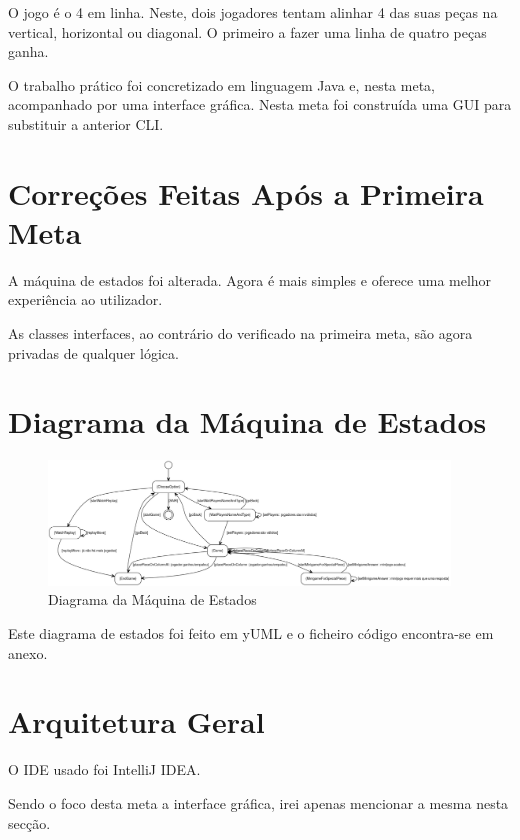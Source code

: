 \documentclass[11pt]{article}
\begin{document}
	O jogo é o 4 em linha. Neste, dois jogadores tentam alinhar 4 das suas peças na vertical, horizontal ou diagonal. O primeiro a fazer uma linha de quatro peças ganha.
	
	O trabalho prático foi concretizado em linguagem Java e, nesta meta, acompanhado por uma interface gráfica. Nesta meta foi construída uma GUI para substituir a anterior CLI.
   	
   	
   	\large
   	\section{Correções Feitas Após a Primeira Meta}
   	\normalsize
   	
   	A máquina de estados foi alterada. Agora é mais simples e oferece uma melhor experiência ao utilizador.
   	
   	As classes interfaces, ao contrário do verificado na primeira meta, são agora privadas de qualquer lógica.
   	
	
	\large
	\section{Diagrama da Máquina de Estados}
	\normalsize
	
	\begin{figure}[h]
		\includegraphics[width=0.95\textwidth,height=0.88\textheight,keepaspectratio]{state-machine-diagram}
		\centering
		\caption{Diagrama da Máquina de Estados}
		\label{fig:sm-diagram}
	\end{figure}
	
	Este diagrama de estados foi feito em yUML e o ficheiro código encontra-se em anexo.
	
	
	\large
	\section{Arquitetura Geral}
	\normalsize
	
	O IDE usado foi IntelliJ IDEA.
	
	Sendo o foco desta meta a interface gráfica, irei apenas mencionar a mesma nesta secção.
	
\end{document}

